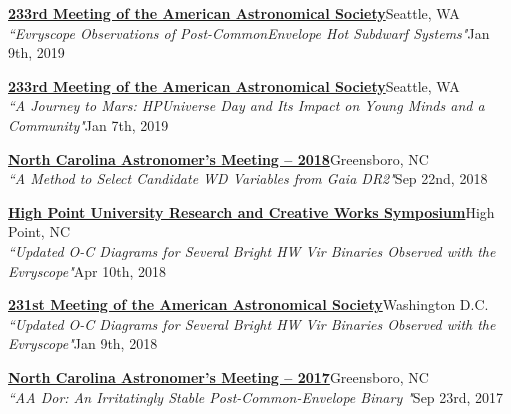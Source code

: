 \documentclass[letterpaper,12pt]{article}
\begin{document}
\begin{etaremune}
    \item \href{https://aas.org/meetings/aas233}{{\small\textbf{233rd Meeting of the American Astronomical Society}}}\hfill{\small Seattle, WA}\\
    {\scriptsize \textit{``Evryscope Observations of Post-CommonEnvelope Hot Subdwarf Systems"}\hfill \footnotesize Jan 9th, 2019}\vspace{-1mm}
    \item \href{https://aas.org/meetings/aas233}{{\small\textbf{233rd Meeting of the American Astronomical Society}}}\hfill{\small Seattle, WA}\\
    {\scriptsize \textit{``A Journey to Mars: HPUniverse Day and Its Impact on Young Minds and a Community"}\hfill \footnotesize Jan 7th, 2019}\vspace{-1mm}
    \item \href{https://www.gtcc.edu/community-engagement/cline-observatory/special-lectures-and-events/ncam.php}{\small\textbf{North Carolina Astronomer's Meeting -- 2018}}\hfill {Greensboro, NC}\\
    {\scriptsize \textit{``A Method to Select Candidate WD Variables from \textit{Gaia} DR2"}\hfill \footnotesize Sep 22nd, 2018}\vspace{-1mm}
    \item \href{http://www.highpoint.edu/highpurcs/}{\footnotesize\textbf{High Point University Research and Creative Works Symposium}}\hfill {High Point, NC}\\
    {\scriptsize \textit{``Updated O-C Diagrams for Several Bright HW Vir Binaries Observed with the Evryscope"}\hfill \footnotesize Apr 10th, 2018}\vspace{-1mm}
    \item \href{https://aas.org/meetings/aas231}{{\small\textbf{231st Meeting of the American Astronomical Society}}}\hfill{\small Washington D.C.}\\
    {\scriptsize \textit{``Updated O-C Diagrams for Several Bright HW Vir Binaries Observed with the Evryscope"}\hfill \footnotesize Jan 9th, 2018}\vspace{-1mm}
    \item \href{https://www.gtcc.edu/community-engagement/cline-observatory/special-lectures-and-events/ncam.php}{\small\textbf{North Carolina Astronomer's Meeting -- 2017}}\hfill {Greensboro, NC}\\
    {\scriptsize \textit{``AA Dor: An Irritatingly Stable Post-Common-Envelope Binary "}\hfill \footnotesize Sep 23rd, 2017}\vspace{-2mm}
\end{etaremune}
\vspace{3mm}
\noindent{}
\end{document}

